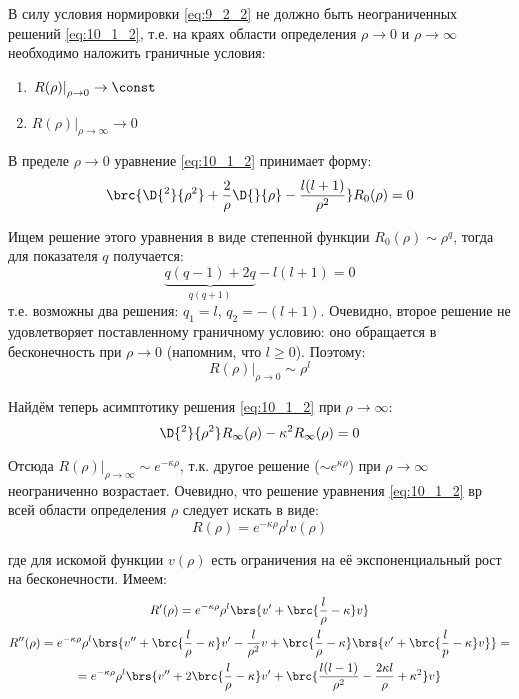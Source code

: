В силу условия нормировки \eqref{eq:9_2_2} не должно быть неограниченных решений \eqref{eq:10_1_2}, т.е. на краях области определения $\rho \to 0$ и $\rho \to \infty$ необходимо наложить граничные условия:
\begin{enumerate}
\item $\left. R(\rho)\right|_{\rho \to 0} \to \const$
\item $\left. R(\rho)\right|_{\rho \to \infty} \to 0$
\end{enumerate}


В пределе $\rho \to 0$ уравнение \eqref{eq:10_1_2} принимает форму:
$$
\brc{\D{^2}{\rho^2} + \frac{2}{\rho}\D{}{\rho} - \frac{l(l+1)}{\rho^2}} R_0(\rho) = 0
$$

Ищем решение этого уравнения в виде степенной функции $R_0(\rho) \sim \rho^q$, тогда для показателя $q$ получается:
$$
\underbrace{q (q - 1) + 2q}_{q(q+1)} - l(l + 1) = 0
$$
т.е. возможны два решения: $q_1 = l$, $q_2 = -(l+1)$. Очевидно, второе решение не удовлетворяет поставленному граничному условию: оно обращается в бесконечность при $\rho \to 0$ (напомним, что $l \geqslant 0$). Поэтому:
$$
\boxed{
	\left. R(\rho)\right|_{\rho \to 0} \sim \rho^l
}
$$

Найдём теперь асимптотику решения \eqref{eq:10_1_2} при $\rho \to \infty$:
$$
\D{^2}{\rho^2}R_\infty(\rho) - \kappa^2 R_\infty(\rho) = 0
$$

Отсюда $\boxed{\left. R(\rho)\right|_{\rho \to \infty} \sim e^{-\kappa \rho}}$, т.к. другое решение ($\sim e^{\kappa \rho}$) при $\rho \to \infty$ неограниченно возрастает. Очевидно, что решение уравнения \eqref{eq:10_1_2} вр всей области определения $\rho$ следует искать в виде:
\begin{equation}
\label{eq:10_2_1}
\boxed{
	R(\rho) = e^{-\kappa \rho} \rho^l v(\rho)
}
\end{equation}

где для искомой функции $v(\rho)$ есть ограничения на её экспоненциальный рост на бесконечности. Имеем:
$$
\begin{gathered}
R'(\rho) = e^{-\kappa \rho} \rho^l \brs{v' + \brc{\frac{l}{\rho} - \kappa} v}\\
R''(\rho) = e^{-\kappa \rho} \rho^l \brs{v'' + \brc{\frac{l}{\rho} - \kappa}v' - \frac{l}{\rho^2}v + \brc{\frac{l}{\rho} - \kappa} \brs{v' + \brc{\frac{l}{p} - \kappa}v} } = \\ = e^{-\kappa \rho} \rho^l \brs{v'' + 2 \brc{\frac{l}{\rho} - \kappa} v' + \brc{ \frac{l(l-1)}{\rho^2} - \frac{2\kappa l}{\rho} + \kappa^2 } v }
\end{gathered}
$$

